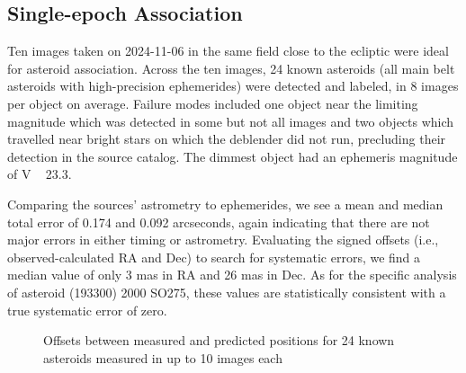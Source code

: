 \subsection{Single-epoch Association}
\label{sec:association}

Ten images taken on 2024-11-06 in the same field close to the ecliptic were ideal for asteroid association. Across the ten images, 24 known asteroids (all main belt asteroids with high-precision ephemerides) were detected and labeled, in 8 images per object on average. Failure modes included one object near the limiting magnitude which was detected in some but not all images and two objects which travelled near bright stars on which the deblender did not run, precluding their detection in the source catalog. The dimmest object had an ephemeris magnitude of V ~ 23.3. 

Comparing the sources' astrometry to ephemerides,  we see a mean and median total error of 0.174 and 0.092 arcseconds, again indicating that there are not major errors in either timing or astrometry. Evaluating the signed offsets (i.e., observed-calculated RA and Dec) to search for systematic errors, we find a median value of only 3 mas in RA and 26 mas in Dec. As for the specific analysis of asteroid (193300) 2000 SO275, these values are statistically consistent with a true systematic error of zero.


\begin{figure}
\caption{Offsets between measured and predicted positions for 24 known asteroids measured in up to 10 images each}
\end{figure}



